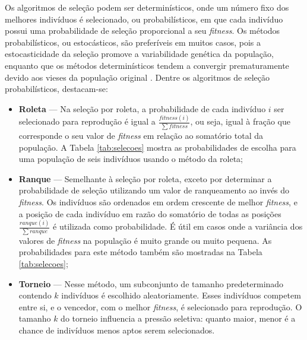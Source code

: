 \documentclass[
	12pt,				%
	openright,			%
	twoside,			%
	a4paper,			%
	tcc,			%
	]{ABNT-DC-UEL}
\begin{document}
Os algoritmos de seleção podem ser determinísticos, onde um número fixo dos melhores indivíduos é selecionado, ou probabilísticos, em que cada indivíduo possui uma probabilidade de seleção proporcional a seu \textit{fitness}. Os métodos probabilísticos, ou estocásticos, são preferíveis em muitos casos, pois a estocasticidade da seleção promove a variabilidade genética da população, enquanto que os métodos determinísticos tendem a convergir prematuramente devido aos vieses da população original \cite{back:00}. Dentre os algoritmos de seleção probabilísticos, destacam-se:
\begin{itemize}
    \item \textbf{Roleta} --- Na seleção por roleta, a probabilidade de cada indivíduo $i$ ser selecionado para reprodução é igual a $\frac{\mathit{fitness}(i)}{\sum \mathit{fitness}}$, ou seja, igual à fração que corresponde o seu valor de \textit{fitness} em relação ao somatório total da população. A Tabela \ref{tab:selecoes} mostra as probabilidades de escolha para uma população de seis indivíduos usando o método da roleta;
    \item \textbf{Ranque} --- Semelhante à seleção por roleta, exceto por determinar a probabilidade de seleção utilizando um valor de ranqueamento ao invés do \textit{fitness}. Os indivíduos são ordenados em ordem crescente de melhor \textit{fitness}, e a posição de cada indivíduo em razão do somatório de todas as posições $\frac{\mathit{ranque}(i)}{\sum \mathit{ranque}}$ é utilizada como probabilidade. É útil em casos onde a variância dos valores de \textit{fitness} na população é muito grande ou muito pequena. As probabilidades para este método também são mostradas na Tabela \ref{tab:selecoes};
    \item \textbf{Torneio} --- Nesse método, um subconjunto de tamanho predeterminado contendo $k$ indivíduos é escolhido aleatoriamente. Esses indivíduos competem entre si, e o vencedor, com o melhor \textit{fitness}, é selecionado para reprodução. O tamanho $k$ do torneio influencia a pressão seletiva: quanto maior, menor é a chance de indivíduos menos aptos serem selecionados.
\end{itemize}
\end{document}
